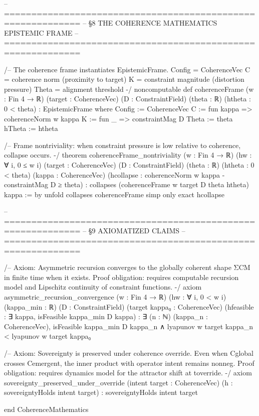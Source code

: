 -- ============================================================
-- §8  THE COHERENCE MATHEMATICS EPISTEMIC FRAME
-- ============================================================

/-- The coherence frame instantiates EpistemicFrame.
    Config  = CoherenceVec
    C       = coherence norm (proximity to target)
    K       = constraint magnitude (distortion pressure)
    Theta   = alignment threshold -/
noncomputable def coherenceFrame (w : Fin 4 → ℝ)
    (target : CoherenceVec) (D : ConstraintField)
    (theta : ℝ) (htheta : 0 < theta) : EpistemicFrame where
  Config := CoherenceVec
  C      := fun kappa => coherenceNorm w kappa
  K      := fun _ => constraintMag D
  Theta  := theta
  hTheta := htheta

/-- Frame nontriviality: when constraint pressure is low
    relative to coherence, collapse occurs. -/
theorem coherenceFrame_nontriviality (w : Fin 4 → ℝ)
    (hw : ∀ i, 0 ≤ w i)
    (target : CoherenceVec) (D : ConstraintField)
    (theta : ℝ) (htheta : 0 < theta)
    (kappa : CoherenceVec)
    (hcollapse : coherenceNorm w kappa - constraintMag D ≥ theta) :
    collapses (coherenceFrame w target D theta htheta) kappa := by
  unfold collapses coherenceFrame
  simp only
  exact hcollapse

-- ============================================================
-- §9  AXIOMATIZED CLAIMS
-- ============================================================

/-- Axiom: Asymmetric recursion converges to the globally
    coherent shape ΣCM in finite time when it exists.
    Proof obligation: requires computable recursion model
    and Lipschitz continuity of constraint functions. -/
axiom asymmetric_recursion_convergence
    (w : Fin 4 → ℝ) (hw : ∀ i, 0 < w i)
    (kappa_min : ℝ) (D : ConstraintField)
    (target kappa₀ : CoherenceVec)
    (hfeasible : ∃ kappa, isFeasible kappa_min D kappa) :
    ∃ (n : ℕ) (kappa_n : CoherenceVec),
      isFeasible kappa_min D kappa_n ∧
      lyapunov w target kappa_n < lyapunov w target kappa₀

/-- Axiom: Sovereignty is preserved under coherence override.
    Even when Cglobal crosses Cemergent, the inner product
    with operator intent remains nonneg.
    Proof obligation: requires dynamics model for the
    attractor shift at toverride. -/
axiom sovereignty_preserved_under_override
    (intent target : CoherenceVec)
    (h : sovereigntyHolds intent target) :
    sovereigntyHolds intent target

end CoherenceMathematics